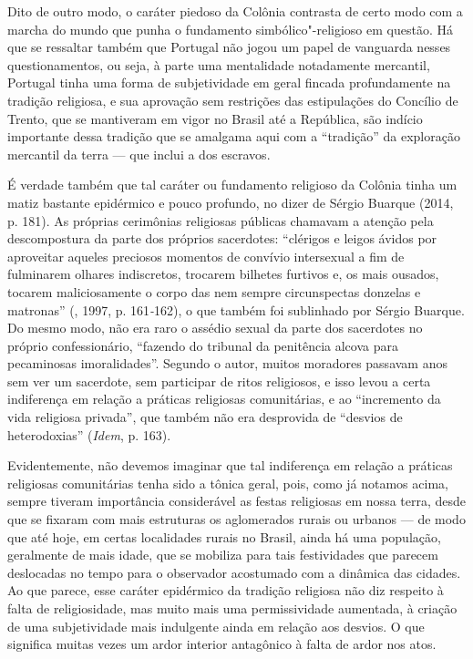 Dito de outro modo, o caráter piedoso da Colônia contrasta de certo modo
com a marcha do mundo que punha o fundamento simbólico"-religioso em
questão. Há que se ressaltar também que Portugal não jogou um papel de
vanguarda nesses questionamentos, ou seja, à parte uma mentalidade
notadamente mercantil, Portugal tinha uma forma de subjetividade em
geral fincada profundamente na tradição religiosa, e sua aprovação sem
restrições das estipulações do Concílio de Trento, que se mantiveram em
vigor no Brasil até a República, são indício
importante dessa tradição que se amalgama aqui com a ``tradição'' da
exploração mercantil da terra --- que inclui a dos escravos.

É verdade também que tal caráter ou fundamento religioso da Colônia
tinha um matiz bastante epidérmico e pouco profundo, no dizer de Sérgio
Buarque (2014, p. 181). As próprias cerimônias religiosas públicas
chamavam a atenção pela descompostura da parte dos próprios sacerdotes:
``clérigos e leigos ávidos por aproveitar aqueles preciosos momentos de
convívio intersexual a fim de fulminarem olhares indiscretos, trocarem
bilhetes furtivos e, os mais ousados, tocarem maliciosamente o corpo das
nem sempre circunspectas donzelas e matronas'' (, 1997, p.
161\emph{-}162), o que também foi sublinhado por Sérgio Buarque.
Do mesmo modo, não era raro o assédio sexual da parte dos sacerdotes no
próprio confessionário, ``fazendo do tribunal da penitência alcova para
pecaminosas imoralidades''. Segundo o autor, muitos moradores passavam
anos sem ver um sacerdote, sem participar de ritos religiosos, e isso
levou a certa indiferença em relação a práticas religiosas comunitárias,
e ao ``incremento da vida religiosa privada'', que também não era
desprovida de ``desvios de heterodoxias'' (\emph{Idem}, p. 163).

Evidentemente, não devemos imaginar que tal indiferença em relação a
práticas religiosas comunitárias tenha sido a tônica geral, pois, como
já notamos acima, sempre tiveram importância considerável as festas
religiosas em nossa terra, desde que se fixaram com mais estruturas os
aglomerados rurais ou urbanos --- de modo que até hoje, em certas
localidades rurais no Brasil, ainda há uma população, geralmente de mais
idade, que se mobiliza para tais festividades que parecem deslocadas no
tempo para o observador acostumado com a dinâmica das cidades. Ao que
parece, esse caráter epidérmico da tradição religiosa não diz respeito à
falta de religiosidade, mas muito mais uma permissividade aumentada, à
criação de uma subjetividade mais indulgente ainda em relação aos
desvios. O que significa muitas vezes um ardor interior antagônico à
falta de ardor nos atos.

